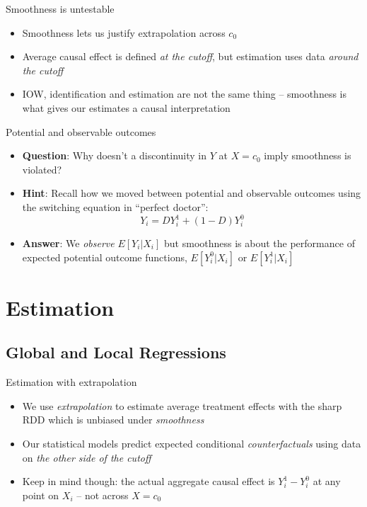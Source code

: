 \documentclass{beamer}
\begin{document}
\begin{frame}{Smoothness is untestable}
	

	\begin{itemize}
	\item Smoothness lets us justify extrapolation across $c_0$ 
	\item Average causal effect is defined \emph{at the cutoff}, but estimation uses data \emph{around the cutoff} 
	\item IOW, identification and estimation are not the same thing -- smoothness is what gives our estimates a causal interpretation
	\end{itemize}
	
\end{frame}


\begin{frame}{Potential and observable outcomes}

	\begin{itemize}
	\item \textbf{Question}: Why doesn't a discontinuity in $Y$ at $X=c_0$ imply smoothness is violated?
	\item \textbf{Hint}: Recall how we moved between potential and observable outcomes using the switching equation in ``perfect doctor'': $$Y_i = DY^1_i + (1-D)Y^0_i$$
	\item \textbf{Answer}: We \emph{observe} $E[Y_i|X_i]$ but smoothness is about the performance of expected potential outcome functions, $E[Y^0_i|X_i]$ or $E[Y^1_i|X_i]$
	\end{itemize}

\end{frame}

\section{Estimation}

\subsection{Global and Local Regressions}



\begin{frame}{Estimation with extrapolation}
	
	\begin{itemize}
	\item We use \emph{extrapolation} to estimate average treatment effects with the sharp RDD which is unbiased under \emph{smoothness}
	\item Our statistical models predict expected conditional \emph{counterfactuals} using data on \emph{the other side of the cutoff}
	\item Keep in mind though: the actual aggregate causal effect is $Y^1_i - Y^0_i$ at any point on $X_i$ -- not across $X=c_0$
	
	\end{itemize}

\end{frame}
\end{document}
